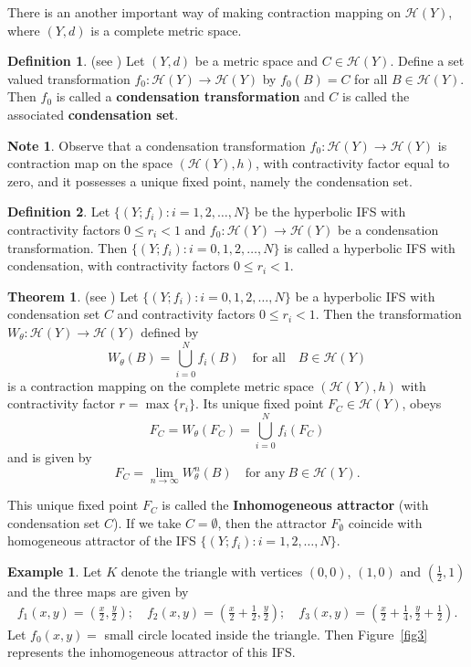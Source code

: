 \documentclass[10pt]{amsart}
\theoremstyle{definition}
\newtheorem{dfn}{Definition}[section]
\newtheorem{exm}{Example}[section]
\newtheorem{thm}{Theorem}[section]
\newtheorem{nt}{Note}[section]
\begin{document}
	There is an another important way of making contraction mapping on $\mathscr{H}(Y)$, where $(Y,d)$ is a complete metric space.
	\begin{dfn}(see \cite{FE,Inssm})
		Let $(Y,d)$ be a metric space and  $C\in \mathscr{H}(Y)$. Define a set valued transformation $f_0:\mathscr{H}(Y)\rightarrow \mathscr{H}(Y)$ by $f_0(B)=C$ for all $B\in \mathscr{H}(Y)$. Then $f_0$ is called a \textbf{condensation transformation} and $C$ is called the associated \textbf{condensation set}.
	\end{dfn}
	\begin{nt}
		Observe that a condensation transformation $f_0:\mathscr{H}(Y)\rightarrow \mathscr{H}(Y)$ is contraction map on the space $(\mathscr{H}(Y),h)$, with contractivity factor equal to zero, and it possesses a unique fixed point, namely the condensation set.
	\end{nt}
	\begin{dfn}
		Let $\{(Y;f_i):i=1,2,\ldots,N\}$ be the hyperbolic IFS with contractivity factors $0\leq r_i<1$ and $f_0:\mathscr{H}(Y)\rightarrow \mathscr{H}(Y)$ be a condensation transformation. Then $\{(Y;f_i):i=0,1,2,\ldots,N\}$ is called a hyperbolic IFS with condensation, with contractivity factors $0\leq r_i<1$.
	\end{dfn}
	\begin{thm}(see \cite{FE,Inssm,Insas}) Let $\{(Y;f_i):i=0,1,2,\ldots,N\}$  be a hyperbolic IFS with condensation set $C$ and contractivity factors $0\leq r_i<1$. Then the transformation $W_{\theta}:\mathscr{H}(Y)\rightarrow \mathscr{H}(Y)$ defined by
		\begin{equation*}
			W_{\theta}(B)=\bigcup_{i=0}^Nf_i(B) \quad \mbox{for all} \quad B\in \mathscr{H}(Y)
		\end{equation*}
		is a contraction mapping on the complete metric space $(\mathscr{H}(Y),h)$ with contractivity factor $r=\max\{r_i\}$. Its unique fixed point $F_C\in \mathscr{H}(Y)$, obeys
		$$F_C=W_{\theta}(F_C)=\bigcup_{i=0}^Nf_i(F_C)$$ and is given by $$F_C=\lim\limits_{n\rightarrow\infty}W_{\theta}^n(B)\quad\mbox{for any}~ B\in \mathscr{H}(Y).$$
		\label{inhomconstrec}
	\end{thm}
	This unique fixed point $F_C$ is called the \textbf{Inhomogeneous attractor} (with condensation set $C$). If we take $C=\emptyset$, then the attractor $F_{\emptyset}$  coincide with homogeneous attractor of the IFS  $\{(Y;f_i):i=1,2,\ldots,N\}$.
	\begin{exm}
		Let $K$ denote the triangle with vertices $(0,0)$, $(1,0)$ and $(\frac{1}{2},1)$ and the three maps are given by
		\begin{align*}
			f_1(x,y)=(\frac{x}{2},\frac{y}{2});\quad
			f_2(x,y)=(\frac{x}{2}+\frac{1}{2},\frac{y}{2});\quad
			f_3(x,y)=(\frac{x}{2}+\frac{1}{4},\frac{y}{2}+\frac{1}{2}).
		\end{align*}
		Let $f_0(x,y)=$ small circle located inside the triangle. Then Figure~\ref{fig3} represents the inhomogeneous attractor of this IFS.	
	\end{exm}
\end{document}
